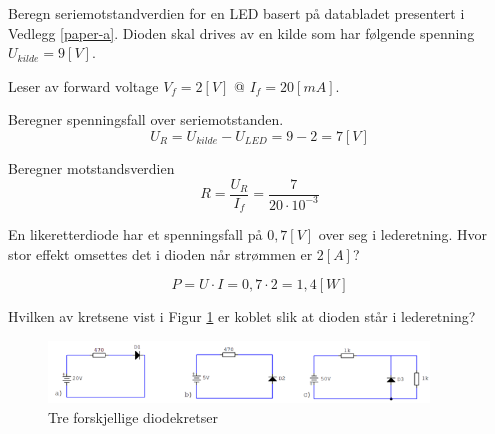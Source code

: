 \begin{question}[name=Oppgave, topic=dioder]
Beregn seriemotstandverdien for en LED basert på databladet presentert i Vedlegg \ref{paper-a}. Dioden skal drives av en kilde som har følgende spenning $U_{kilde}=9 [V]$.
\end{question}

\vspace{0.5cm} %

\begin{solution}[name=Løsningsforslag oppgave]
Leser av forward voltage $V_f=2 [V]$ @ $I_f=20[mA]$.

Beregner spenningsfall over seriemotstanden.
\[U_R=U_{kilde}-U_{LED}= 9-2=7[V]\]

Beregner motstandsverdien
\[R=\frac{U_R}{I_f}=\frac{7}{20 \cdot 10^{-3}}\]

\end{solution}








\vspace{0.5cm} %

\begin{question}[name=Oppgave, topic=dioder]
En likeretterdiode har et spenningsfall på $0,7 [V]$ over seg i lederetning. Hvor stor effekt omsettes det i dioden når strømmen er $2 [A]$?
\end{question}

\vspace{0.5cm} %


\begin{solution}[name=Løsningsforslag oppgave]
\[P=U\cdot I = 0,7\cdot2=1,4 [W]\]

\end{solution}

\vspace{0.5cm} %

\begin{question}[name=Oppgave, topic=dioder]
	Hvilken av kretsene vist i Figur \ref{fig:3kretser} er koblet slik at dioden står i lederetning?

	\begin{figure}[H]
		\centering
		\includegraphics[width=0.9\textwidth]{diode/figurer/3Kretser.png}
		\caption{Tre forskjellige diodekretser}
		\label{fig:3kretser}
	\end{figure}

\end{question}

